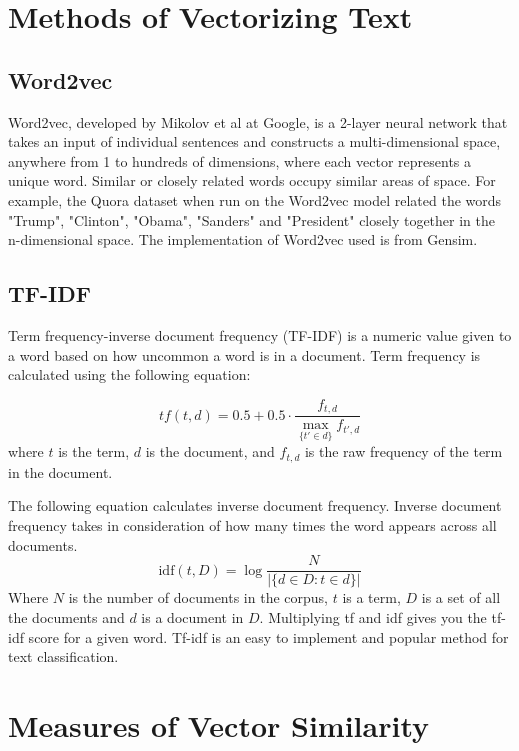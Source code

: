 \documentclass[9pt,twocolumn,twoside]{idsi}
\begin{document}
\section{Methods of Vectorizing Text}

\subsection{Word2vec}
Word2vec, developed by Mikolov et al at Google, is a 2-layer neural network that takes an input of individual sentences and constructs a multi-dimensional space, anywhere from 1 to hundreds of dimensions, where each vector represents a unique word. Similar or closely related words occupy similar areas of space. For example, the Quora dataset when run on the Word2vec model related the words "Trump", "Clinton", "Obama", "Sanders" and "President" closely together in the n-dimensional space. The implementation of Word2vec used is from Gensim.
\subsection{TF-IDF}
Term frequency-inverse document frequency (TF-IDF) is a numeric value given to a word based on how uncommon a word is in a document. Term frequency is calculated using the following equation:

\begin{equation}
{\displaystyle tf(t,d) = 0.5+0.5\cdot {\frac {f_{t,d}}{\max _{\{t'\in d\}}{f_{t',d}}}}}
\end{equation}
where $t$ is the term, $d$ is the document, and $f_{t,d}$ is the raw frequency of the term in the document.

The following equation calculates inverse document frequency. Inverse document frequency takes in consideration of how many times the word appears across all documents.
\begin{equation}
 \mathrm{idf}(t, D) =  \log \frac{N}{|\{d \in D: t \in d\}|}
\end{equation}
Where $N$ is the number of documents in the corpus, $t$ is a term, $D$ is a set of all the documents and $d$ is a document in $D$.
Multiplying tf and idf gives you the tf-idf score for a given word. Tf-idf is an easy to implement and popular method for text classification.

\section{Measures of Vector Similarity}
\end{document}
